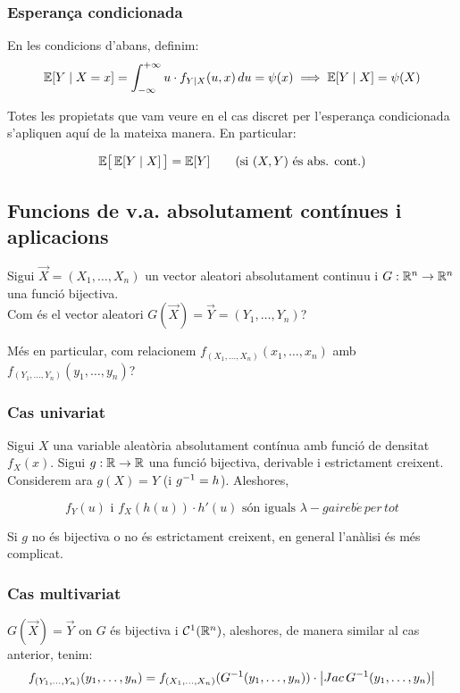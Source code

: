 \subsubsection{Esperança condicionada}

En les condicions d'abans, definim:
\[
  \mathbb{E}[Y\mid X=x] = \int_{-\infty}^{+\infty}u\cdot f_{Y\mid X}(u,x)\, du = \psi(x) \implies \mathbb{E}[Y\mid X] = \psi(X)
\]

Totes les propietats que vam veure en el cas discret per l'esperança condicionada s'apliquen aquí de la mateixa manera. En particular:

\begin{prop}
  \[
    \mathbb{E}\big[\,\mathbb{E}[Y\mid X]\,\big] = \mathbb{E}[Y] \qquad \text{(si $(X,Y)$ és abs. cont.)}
  \]
\end{prop}

\subsection{Funcions de v.a. absolutament contínues i aplicacions}

Sigui $\overrightarrow{X} = (X_{1}, \ldots , X_{n})$ un vector aleatori absolutament 
continuu i $G:\mathbb{R}^{n} \to \mathbb{R}^{n}$ una funció bijectiva. \\
Com és el vector aleatori $G(\overrightarrow{X}) = \overrightarrow{Y} = (Y_1, \ldots, Y_n)$?

Més en particular, com relacionem $f_{(X_{1},\ldots, X_{n})}(x_{1},\ldots,x_{n})$ amb $f_{(Y_{1},\ldots, Y_{n})}(y_{1},\ldots,y_{n})$?

\subsubsection{Cas univariat}
Sigui $X$ una variable aleatòria absolutament contínua amb funció de densitat $f_{X}(x)$. Sigui $g:\mathbb{R} \to \mathbb{R}$ una funció bijectiva, derivable i estrictament creixent. Considerem ara $g(X) = Y$ (i $g^{-1} = h$). Aleshores,

\[f_{Y}(u) \text{ i } f_{X}(h(u))\cdot h'(u) \text{ són iguals } \lambda-gaireb\acute{e} \, per \, tot\]

\begin{obs}
  Si $g$ no és bijectiva o no és estrictament creixent, en general l'anàlisi és més complicat.
\end{obs}

\subsubsection{Cas multivariat}
$G(\overrightarrow{X}) = \overrightarrow{Y}$ on $G$ és bijectiva i $\mathcal{C}^{1}(\mathbb{R}^{n})$, aleshores, de manera similar al cas anterior, tenim:
\[
  f_{(Y_{1},\ldots,Y_{n})}(y_{1},\ldots,y_{n}) = f_{(X_{1},\ldots,X_{n})}(G^{-1}(y_{1},\ldots,y_{n}))\cdot \left\vert Jac\,G^{-1}(y_{1},\ldots,y_{n}) \right\vert
\]

